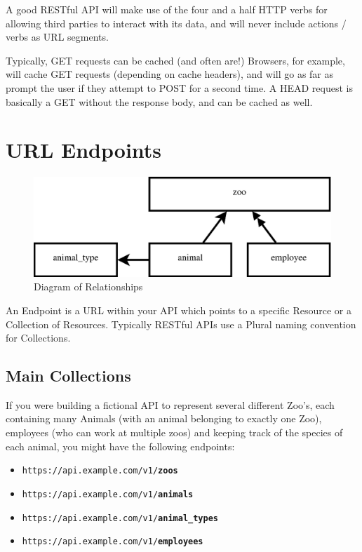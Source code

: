 \documentclass{book}
\begin{document}
A good RESTful API will make use of the four and a half HTTP verbs for allowing third parties to interact with its data, and will never include actions / verbs as URL segments.

Typically, GET requests can be cached (and often are!) Browsers, for example, will cache GET requests (depending on cache headers), and will go as far as prompt the user if they attempt to POST for a second time. A HEAD request is basically a GET without the response body, and can be cached as well.


\section{URL Endpoints}

\begin{figure}[ht!]
\centering
\includegraphics[scale=.5]{images/zoo-relationships.eps}
\caption{Diagram of Relationships}
\label{fig:zoorelationships}
\end{figure}

An Endpoint is a URL within your API which points to a specific Resource or a Collection of Resources. Typically RESTful APIs use a Plural naming convention for Collections.

\subsection{Main Collections}

If you were building a fictional API to represent several different Zoo's, each containing many Animals (with an animal belonging to exactly one Zoo), employees (who can work at multiple zoos) and keeping track of the species of each animal, you might have the following endpoints:

\begin{itemize}
\item \texttt{https://api.example.com/v1/\textbf{zoos}}
\item \texttt{https://api.example.com/v1/\textbf{animals}}
\item \texttt{https://api.example.com/v1/\textbf{animal\_types}}
\item \texttt{https://api.example.com/v1/\textbf{employees}}
\end{itemize}
\end{document}
